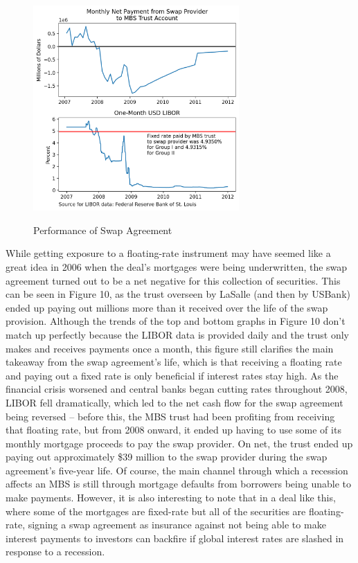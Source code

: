 \documentclass[12pt]{article}
\begin{document}
\begin{figure}[h]
	\centering
	\caption{Performance of Swap Agreement}
	\includegraphics[width=0.7\textwidth]{../figures/timeseries_swap_performance}
	\label{fig:timeseries_swap_performance}
\end{figure}

While getting exposure to a floating-rate instrument may have seemed like a great idea in 2006 when the deal’s mortgages were being underwritten, the swap agreement turned out to be a net negative for this collection of securities. This can be seen in Figure 10, as the trust overseen by LaSalle (and then by USBank) ended up paying out millions more than it received over the life of the swap provision. Although the trends of the top and bottom graphs in Figure 10 don’t match up perfectly because the LIBOR data is provided daily and the trust only makes and receives payments once a month, this figure still clarifies the main takeaway from the swap agreement’s life, which is that receiving a floating rate and paying out a fixed rate is only beneficial if interest rates stay high. As the financial crisis worsened and central banks began cutting rates throughout 2008, LIBOR fell dramatically, which led to the net cash flow for the swap agreement being reversed – before this, the MBS trust had been profiting from receiving that floating rate, but from 2008 onward, it ended up having to use some of its monthly mortgage proceeds to pay the swap provider. On net, the trust ended up paying out approximately \$39 million to the swap provider during the swap agreement’s five-year life. Of course, the main channel through which a recession affects an MBS is still through mortgage defaults from borrowers being unable to make payments. However, it is also interesting to note that in a deal like this, where some of the mortgages are fixed-rate but all of the securities are floating-rate, signing a swap agreement as insurance against not being able to make interest payments to investors can backfire if global interest rates are slashed in response to a recession.
\end{document}
